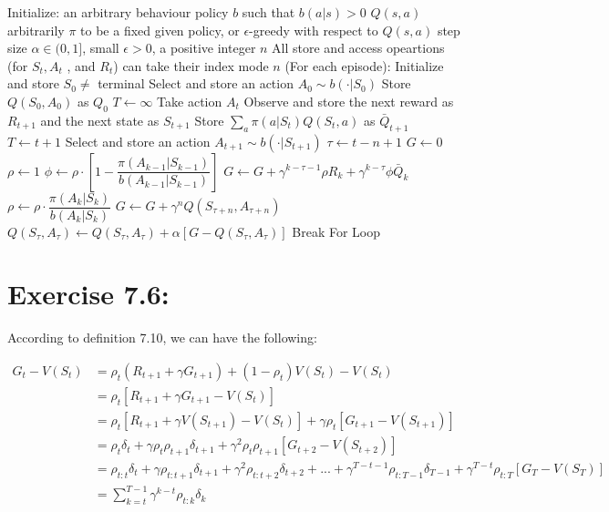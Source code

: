\documentclass[10pt,letterpaper]{article}
\begin{document}
\begin{algorithmic}
\State Initialize:
\Indent
\State an arbitrary behaviour policy $b$ such that $ b(a|s)>0$
\State $Q(s,a)$ arbitrarily
\State $\pi$ to be a fixed given policy, or $\epsilon$-greedy with respect to $Q(s,a)$
\State step size $\alpha \in (0,1]$, small $\epsilon>0$, a positive integer $n$
\EndIndent
\State All store and access opeartions (for $S_t, A_t$ , and $R_t$) can take their index mode $n$
\Repeat (For each episode):
\State Initialize and store $S_0 \neq$ terminal
\State Select and store an action $A_0 \sim b(\cdot|S_0)$
\State Store $Q(S_0, A_0)$ as $Q_0$
\State $T \gets \infty$
\State Take action $A_t$
\State Observe and store the next reward as $R_{t+1}$ and the next state as $S_{t+1}$
\State Store $\sum_a\pi(a|S_t)Q(S_t,a)$ as $\bar{Q}_{t+1}$
\State $T \gets t + 1$
\Else
\State Select and store an action $A_{t+1} \sim b(\cdot|S_{t+1})$
\EndIf
\EndIf
\State $\tau \gets t-n+1$
\State $G \gets 0$
\State $\rho \gets 1$
\State $\phi \gets \rho \cdot [1-\dfrac{\pi(A_{k-1}|S_{k-1})}{b(A_{k-1}|S_{k-1})}]$
\State $G \gets G + \gamma^{k-\tau-1}\rho R_k + \gamma^{k-\tau}\phi \bar{Q}_{k}$
\State $\rho \gets \rho \cdot \dfrac{\pi(A_k|S_k)}{b(A_k|S_k)}$
\EndFor
{}
\State $G \gets G + \gamma^nQ(S_{\tau+n}, A_{\tau+n})$
\EndIf
\State $Q(S_\tau, A_\tau) \gets Q(S_\tau, A_\tau) + \alpha[G -Q(S_\tau, A_\tau)]$
\EndIf
{}
\State Break For Loop
\EndIf
\EndFor
{}
\end{algorithmic}


\section*{Exercise 7.6: }
\label{7.6}

According to definition 7.10, we can have the following:

\begin{align*}
G_t - V(S_t) &= \rho_t(R_{t+1} + \gamma G_{t+1}) + (1-\rho_t)V(S_t) - V(S_t)\\
&= \rho_t[R_{t+1} + \gamma G_{t+1} - V(S_t)]\\
&= \rho_t[R_{t+1} + \gamma V(S_{t+1}) - V(S_t)] +\gamma\rho_t[G_{t+1} - V(S_{t+1})]\\
&= \rho_t\delta_t + \gamma\rho_t\rho_{t+1}\delta_{t+1} + \gamma^2\rho_t\rho_{t+1}[G_{t+2} - V(S_{t+2})]\\
&= \rho_{t:t}\delta_t + \gamma\rho_{t:t+1}\delta_{t+1} + \gamma^2\rho_{t:t+2}\delta_{t+2} + ... + \gamma^{T-t-1}\rho_{t:T-1}\delta_{T-1} + \gamma^{T-t}\rho_{t:T}[G_{T}- V(S_{T})]\\
&= \sum_{k=t}^{T-1}\gamma^{k-t}\rho_{t:k}\delta_k
\end{align*}
\end{document}

